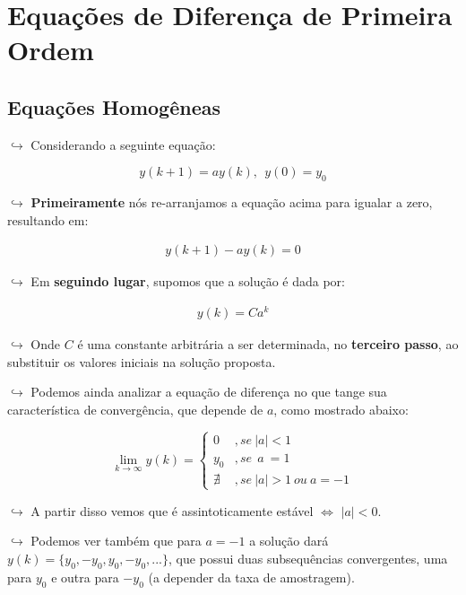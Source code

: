 \documentclass[]{article}
\begin{document}
  \hypertarget{equauxe7uxf5es-de-diferenuxe7a-de-primeira-ordem}{%
  \section{Equações de Diferença de Primeira
  Ordem}\label{equauxe7uxf5es-de-diferenuxe7a-de-primeira-ordem}}

  \hypertarget{equauxe7uxf5es-homoguxeaneas}{%
  \subsection{Equações Homogêneas}\label{equauxe7uxf5es-homoguxeaneas}}

  \(\hookrightarrow\) Considerando a seguinte equação:

  \[
  y(k+1) = a y(k), \ \ y(0) = y_0
  \]

  \(\hookrightarrow\) \textbf{Primeiramente} nós re-arranjamos a equação
  acima para igualar a zero, resultando em:

  \[
  \begin{align}
  y(k+1) - ay(k) = 0
  \end{align}
  \]

  \(\hookrightarrow\) Em \textbf{seguindo lugar}, supomos que a solução é
  dada por:

  \[
  \begin{align}
  y(k) = C a^k
  \end{align}
  \]

  \(\hookrightarrow\) Onde \(C\) é uma constante arbitrária a ser
  determinada, no \textbf{terceiro passo}, ao substituir os valores
  iniciais na solução proposta.

  \(\hookrightarrow\) Podemos ainda analizar a equação de diferença no que
  tange sua característica de convergência, que depende de \(a\), como
  mostrado abaixo:

  \[
  \lim_{k \rightarrow \infty} y(k) = \begin{cases}
  0 & , se \ |a| < 1  \\ 
  y_0 &, se \ \ a \ = 1 \\ 
  \nexists & , se \ |a| > 1 \ ou \ a=-1
  \end{cases}
  \]

  \(\hookrightarrow\) A partir disso vemos que é assintoticamente estável
  \(\iff\) \(|a| < 0\).

  \(\hookrightarrow\) Podemos ver também que para \(a = -1\) a solução
  dará \(y(k) = \{y_0, -y_0, y_0, -y_0, ...\}\), que possui duas
  subsequências convergentes, uma para \(y_0\) e outra para \(-y_0\) (a
  depender da taxa de amostragem).
\end{document}
